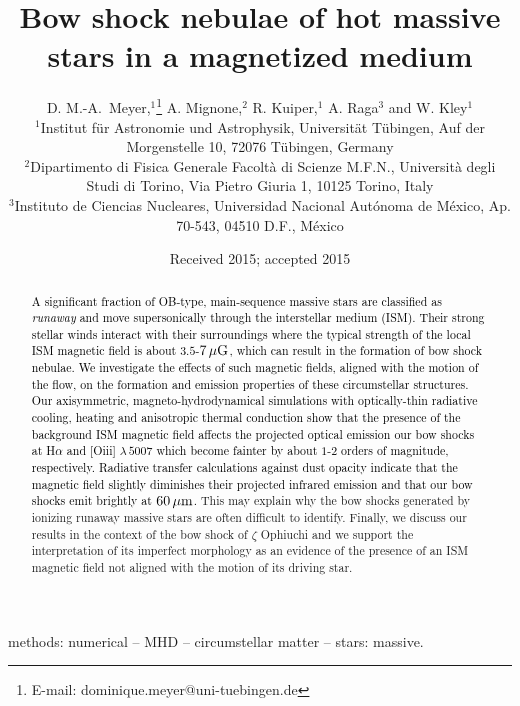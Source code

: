 \documentclass[useAMS,usenatbib]{mn2e}
\title[Bow shock nebulae of hot massive stars in a magnetized medium]{Bow shock nebulae of hot massive stars in a magnetized medium}
\author[D. M.-A.~Meyer et al.]
       {D. M.-A.~Meyer,$^{1}$\thanks{E-mail: dominique.meyer@uni-tuebingen.de} A. Mignone,$^{2}$ R. Kuiper,$^{1}$ A. Raga$^{3}$ and W. Kley$^{1}$ 
       \\
       $^{1}$Institut f\" ur Astronomie und Astrophysik, Universit\" at T\" ubingen,  Auf der Morgenstelle 10, 72076 T\" ubingen, Germany \\
       $^{2}$Dipartimento di Fisica Generale Facolt\`a di Scienze M.F.N., Universit\`a degli Studi di Torino, Via Pietro Giuria 1, 10125 Torino, Italy \\ 
       $^{3}$Instituto de Ciencias Nucleares, Universidad Nacional Aut\' onoma de M\' exico, Ap. 70-543, 04510 D.F., M\' exico \\
       }
\begin{document}
 


\date{Received 2015; accepted 2015}

\maketitle


\label{firstpage}


\begin{abstract}

\textcolor{black}{
A significant fraction of OB-type, main-sequence massive stars are classified 
as {\it runaway} and move supersonically through the interstellar medium (ISM). 
Their strong stellar winds interact with their surroundings \textcolor{black}{where the} 
typical strength of the local ISM magnetic field is about $3.5$-$7\, \mu \rm G$, which 
can result in the formation of bow shock nebulae. 
%
We investigate the effects of such magnetic field\textcolor{black}{s}, aligned with the motion of 
the flow, on the formation and emission properties of these circumstellar structures. 
}
%
\textcolor{black}{
Our axisymmetric, magneto-hydrodynamical simulations with optically-thin radiative 
cooling, heating and anisotropic thermal conduction show that the  
presence of the background ISM magnetic field affects the projected optical emission our bow 
shocks at H$\alpha$ and [O{\sc iii}] $\lambda \, 5007$ 
which become fainter by about $1$-$2$ orders of magnitude, respectively. 
%
Radiative transfer calculations against dust opacity indicate that the magnetic 
field slightly diminishes their projected infrared emission and that our bow 
shocks emit brightly at $60\, \mu \rm m$. 
} 
%
This may explain why the bow shocks generated 
by ionizing runaway massive stars are often difficult to identify. 
Finally, we discuss our results in the context of the bow shock of $\zeta$ Ophiuchi and 
we support the interpretation of its imperfect morphology as an evidence of the presence 
of an ISM magnetic field not aligned with the motion of its driving star. 

\end{abstract}


\begin{keywords}
methods: numerical -- MHD  -- circumstellar matter -- stars: massive.
\end{keywords} 


\end{document}
